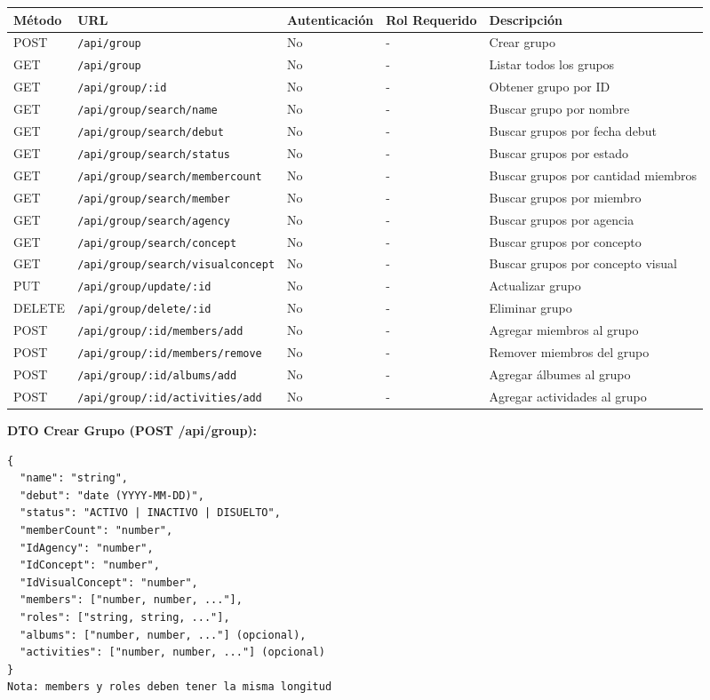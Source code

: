 \documentclass[11pt]{article}
\begin{document}
\begin{longtable}{lllll}
\toprule
\textbf{Método} & \textbf{URL} & \textbf{Autenticación} & \textbf{Rol Requerido} & \textbf{Descripción} \\
\midrule
\endhead
POST & \texttt{/api/group} & No & - & Crear grupo \\
GET & \texttt{/api/group} & No & - & Listar todos los grupos \\
GET & \texttt{/api/group/:id} & No & - & Obtener grupo por ID \\
GET & \texttt{/api/group/search/name} & No & - & Buscar grupo por nombre \\
GET & \texttt{/api/group/search/debut} & No & - & Buscar grupos por fecha debut \\
GET & \texttt{/api/group/search/status} & No & - & Buscar grupos por estado \\
GET & \texttt{/api/group/search/membercount} & No & - & Buscar grupos por cantidad miembros \\
GET & \texttt{/api/group/search/member} & No & - & Buscar grupos por miembro \\
GET & \texttt{/api/group/search/agency} & No & - & Buscar grupos por agencia \\
GET & \texttt{/api/group/search/concept} & No & - & Buscar grupos por concepto \\
GET & \texttt{/api/group/search/visualconcept} & No & - & Buscar grupos por concepto visual \\
PUT & \texttt{/api/group/update/:id} & No & - & Actualizar grupo \\
DELETE & \texttt{/api/group/delete/:id} & No & - & Eliminar grupo \\
POST & \texttt{/api/group/:id/members/add} & No & - & Agregar miembros al grupo \\
POST & \texttt{/api/group/:id/members/remove} & No & - & Remover miembros del grupo \\
POST & \texttt{/api/group/:id/albums/add} & No & - & Agregar álbumes al grupo \\
POST & \texttt{/api/group/:id/activities/add} & No & - & Agregar actividades al grupo \\
\bottomrule
\end{longtable}

\textbf{DTO Crear Grupo (POST /api/group):}
\begin{Verbatim}
{
  "name": "string",
  "debut": "date (YYYY-MM-DD)",
  "status": "ACTIVO | INACTIVO | DISUELTO",
  "memberCount": "number",
  "IdAgency": "number",
  "IdConcept": "number",
  "IdVisualConcept": "number",
  "members": ["number, number, ..."],
  "roles": ["string, string, ..."],
  "albums": ["number, number, ..."] (opcional),
  "activities": ["number, number, ..."] (opcional)
}
Nota: members y roles deben tener la misma longitud
\end{Verbatim}
\end{document}
